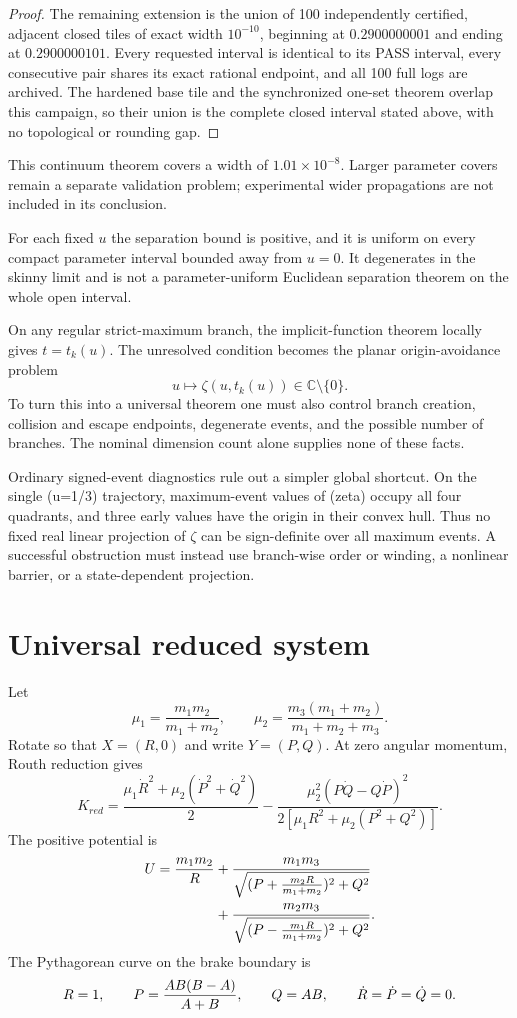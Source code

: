 \documentclass[11pt]{article}
\begin{document}
\begin{proof}
The remaining extension is the union of 100 independently certified,
adjacent closed tiles of exact width $10^{-10}$, beginning at
$0.2900000001$ and ending at $0.2900000101$.  Every requested interval is
identical to its PASS interval, every consecutive pair shares its exact
rational endpoint, and all 100 full logs are archived.  The hardened base
tile and the synchronized one-set theorem overlap this campaign, so their
union is the complete closed interval stated above, with no topological or
rounding gap.
\end{proof}

This continuum theorem covers a width of $1.01\times10^{-8}$. Larger
parameter covers remain a separate validation problem; experimental wider
propagations are not included in its conclusion.

For each fixed $u$ the separation bound is positive, and it is uniform on
every compact parameter interval bounded away from $u=0$.  It degenerates in
the skinny limit and is not a parameter-uniform Euclidean separation theorem
on the whole open interval.

On any regular strict-maximum branch, the implicit-function theorem locally
gives $t=t_k(u)$.  The unresolved condition becomes the planar
origin-avoidance problem
\[
 u\longmapsto \zeta(u,t_k(u))\in\mathbb C\setminus\{0\}.
\]
To turn this into a universal theorem one must also control branch creation,
collision and escape endpoints, degenerate events, and the possible number
of branches.  The nominal dimension count alone supplies none of these
facts.

Ordinary signed-event diagnostics rule out a simpler global shortcut.  On
the single (u=1/3) trajectory, maximum-event values of (zeta) occupy all
four quadrants, and three early values have the origin in their convex hull.
Thus no fixed real linear projection of $\zeta$ can be sign-definite over
all maximum events.  A successful obstruction must instead use branch-wise
order or winding, a nonlinear barrier, or a state-dependent projection.

\section{Universal reduced system}

Let
\[
\mu_1=\frac{m_1m_2}{m_1+m_2},\qquad
\mu_2=\frac{m_3(m_1+m_2)}{m_1+m_2+m_3}.
\]
Rotate so that $X=(R,0)$ and write $Y=(P,Q)$.  At zero angular momentum,
Routh reduction gives
\[
K_{red}=\frac{\mu_1\dot R^2+\mu_2(\dot P^2+\dot Q^2)}2
-\frac{\mu_2^2(P\dot Q-Q\dot P)^2}
{2[\mu_1R^2+\mu_2(P^2+Q^2)]}.
\]
The positive potential is
\begin{align*}
U={m_1m_2\over R}
&+{m_1m_3\over\sqrt{(P+{m_2R\over m_1+m_2})^2+Q^2}}\\
&+{m_2m_3\over\sqrt{(P-{m_1R\over m_1+m_2})^2+Q^2}}.
\end{align*}
The Pythagorean curve on the brake boundary is
\[
R=1,\qquad P={AB(B-A)\over A+B},\qquad Q=AB,
\qquad \dot R=\dot P=\dot Q=0.
\]
\end{document}
